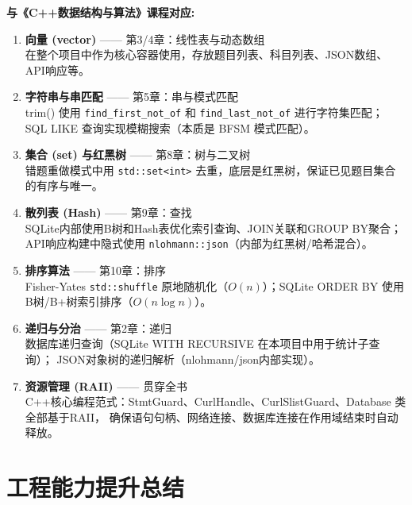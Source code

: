 \documentclass[12pt,a4paper]{ctexart}
\begin{document}
\begin{dsbox}
\textbf{与《C++数据结构与算法》课程对应:}\\[4pt]

\begin{enumerate}[nosep,leftmargin=*]
    \item \textbf{向量 (vector)} —— 第3/4章：线性表与动态数组\\
    在整个项目中作为核心容器使用，存放题目列表、科目列表、JSON数组、API响应等。

    \item \textbf{字符串与串匹配} —— 第5章：串与模式匹配\\
    trim() 使用 \texttt{find\_first\_not\_of} 和 \texttt{find\_last\_not\_of} 进行字符集匹配；
    SQL LIKE 查询实现模糊搜索（本质是 BFSM 模式匹配）。

    \item \textbf{集合 (set) 与红黑树} —— 第8章：树与二叉树\\
    错题重做模式中用 \texttt{std::set<int>} 去重，底层是红黑树，保证已见题目集合的有序与唯一。

    \item \textbf{散列表 (Hash)} —— 第9章：查找\\
    SQLite内部使用B树和Hash表优化索引查询、JOIN关联和GROUP BY聚合；
    API响应构建中隐式使用 \texttt{nlohmann::json}（内部为红黑树/哈希混合）。

    \item \textbf{排序算法} —— 第10章：排序\\
    Fisher-Yates \texttt{std::shuffle} 原地随机化（$O(n)$）；SQLite ORDER BY 使用B树/B+树索引排序（$O(n \log n)$）。

    \item \textbf{递归与分治} —— 第2章：递归\\
    数据库递归查询（SQLite WITH RECURSIVE 在本项目中用于统计子查询）；
    JSON对象树的递归解析（nlohmann/json内部实现）。

    \item \textbf{资源管理 (RAII)} —— 贯穿全书\\
    C++核心编程范式：StmtGuard、CurlHandle、CurlSlistGuard、Database 类全部基于RAII，
    确保语句句柄、网络连接、数据库连接在作用域结束时自动释放。
\end{enumerate}
\end{dsbox}

\newpage

\section{工程能力提升总结}
\end{document}

